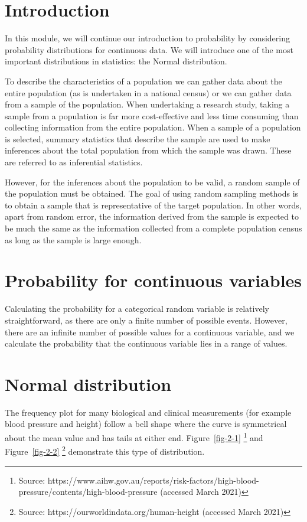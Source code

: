 \documentclass[
  a4paper,
]{memoir}
\begin{document}
\section{Introduction}\label{introduction-2}

In this module, we will continue our introduction to probability by
considering probability distributions for continuous data. We will
introduce one of the most important distributions in statistics: the
Normal distribution.

To describe the characteristics of a population we can gather data about
the entire population (as is undertaken in a national census) or we can
gather data from a sample of the population. When undertaking a research
study, taking a sample from a population is far more cost-effective and
less time consuming than collecting information from the entire
population. When a sample of a population is selected, summary
statistics that describe the sample are used to make inferences about
the total population from which the sample was drawn. These are referred
to as inferential statistics.

However, for the inferences about the population to be valid, a random
sample of the population must be obtained. The goal of using random
sampling methods is to obtain a sample that is representative of the
target population. In other words, apart from random error, the
information derived from the sample is expected to be much the same as
the information collected from a complete population census as long as
the sample is large enough.

\section{Probability for continuous
variables}\label{probability-for-continuous-variables}

Calculating the probability for a categorical random variable is
relatively straightforward, as there are only a finite number of
possible events. However, there are an infinite number of possible
values for a continuous variable, and we calculate the probability that
the continuous variable lies in a range of values.

\section{Normal distribution}\label{normal-distribution}

The frequency plot for many biological and clinical measurements (for
example blood pressure and height) follow a bell shape where the curve
is symmetrical about the mean value and has tails at either end.
Figure~\ref{fig-2-1} \footnote{Source:
  https://www.aihw.gov.au/reports/risk-factors/high-blood-pressure/contents/high-blood-pressure
  (accessed March 2021)} and Figure~\ref{fig-2-2} \footnote{Source:
  https://ourworldindata.org/human-height (accessed March 2021)}
demonstrate this type of distribution.
\end{document}

